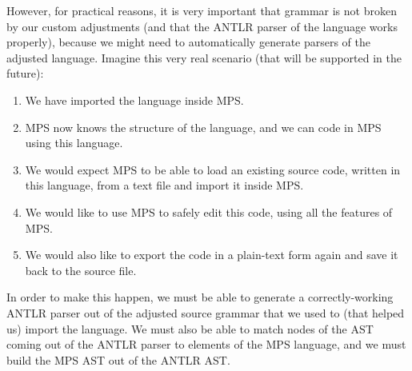 However, for practical reasons, it is very important that grammar is not broken by our custom adjustments (and that the ANTLR parser of the language works properly), because we might need to automatically generate parsers of the adjusted language.
Imagine this very real scenario (that will be supported in the future):
\begin{enumerate}
	\item We have imported the language inside MPS.
	\item MPS now knows the structure of the language, and we can code in MPS using this language.
	\item We would expect MPS to be able to load an existing source code, written in this language, from a text file and import it inside MPS.
	\item We would like to use MPS to safely edit this code, using all the features of MPS.
	\item We would also like to export the code in a plain-text form again and save it back to the source file.
\end{enumerate}
In order to make this happen, we must be able to generate a correctly-working ANTLR parser out of the adjusted source grammar that we used to (that helped us) import the language.
We must also be able to match nodes of the AST coming out of the ANTLR parser to elements of the MPS language, and we must build the MPS AST out of the ANTLR AST.
